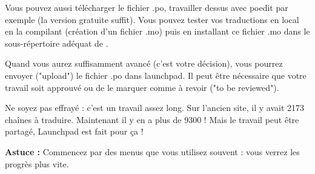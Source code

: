 Vous pouvez aussi télécharger le fichier .po, travailler dessus avec poedit par exemple (la version gratuite suffit). Vous pouvez tester vos traductions en local en la compilant (création d'un fichier .mo) puis en installant ce fichier .mo dans le sous-répertoire adéquat de \codeblocks.

Quand vous aurez suffisamment avancé (c'est votre décision), vous pourrez envoyer ("upload") le fichier .po dans launchpad. Il peut être nécessaire que votre travail soit approuvé ou de le marquer comme à revoir ("to be reviewed").

Ne soyez pas effrayé : c'est un travail assez long. Sur l'ancien site, il y avait 2173 chaînes à traduire. Maintenant il y en a plus de 9300 ! Mais le travail peut être partagé, Launchpad est fait pour ça !

\textbf{Astuce :} Commencez par des menus que vous utilisez souvent : vous verrez les progrès plus vite.

